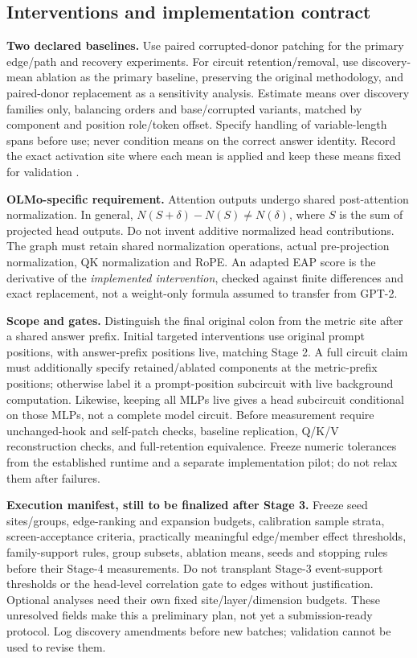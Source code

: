\documentclass[11pt,a4paper]{article}
\begin{document}
\subsection{Interventions and implementation contract}
\textbf{Two declared baselines.} Use paired corrupted-donor patching for the
primary edge/path and recovery experiments. For circuit retention/removal,
use discovery-mean ablation as the primary baseline, preserving the original
methodology, and paired-donor replacement as a sensitivity analysis. Estimate
means over discovery families only, balancing orders and base/corrupted
variants, matched by component and position role/token offset. Specify handling
of variable-length spans before use; never condition means on the correct
answer identity. Record the exact activation site where each mean is applied
and keep these means fixed for validation \cite{patchguide,bestpractices}.

\textbf{OLMo-specific requirement.} Attention outputs undergo shared
post-attention normalization. In general,
$N(S+\delta)-N(S)\ne N(\delta)$, where $S$ is the sum of projected head
outputs. Do not invent additive normalized head contributions. The graph must
retain shared normalization operations, actual pre-projection normalization,
QK normalization and RoPE. An adapted EAP score is the derivative of the
\emph{implemented intervention}, checked against finite differences and exact
replacement, not a weight-only formula assumed to transfer from GPT-2.

\textbf{Scope and gates.} Distinguish the final original colon from the metric
site after a shared answer prefix. Initial targeted interventions use original
prompt positions, with answer-prefix positions live, matching Stage 2. A full
circuit claim must additionally specify retained/ablated components at the
metric-prefix positions; otherwise label it a prompt-position subcircuit with
live background computation. Likewise, keeping all MLPs live gives a
head subcircuit conditional on those MLPs, not a complete model circuit.
Before measurement require unchanged-hook and self-patch checks, baseline
replication, Q/K/V reconstruction checks, and full-retention equivalence. Freeze
numeric tolerances from the established runtime and a separate implementation
pilot; do not relax them after failures.

\textbf{Execution manifest, still to be finalized after Stage 3.} Freeze seed
sites/groups, edge-ranking and expansion budgets, calibration sample strata,
screen-acceptance criteria, practically meaningful edge/member effect
thresholds, family-support rules, group subsets, ablation means, seeds and
stopping rules before their Stage-4 measurements. Do not transplant Stage-3
event-support thresholds or the head-level correlation gate to edges without
justification. Optional analyses need their own fixed site/layer/dimension
budgets. These unresolved fields make this a preliminary plan, not yet a
submission-ready protocol. Log discovery amendments before new batches;
validation cannot be used to revise them.
\end{document}
